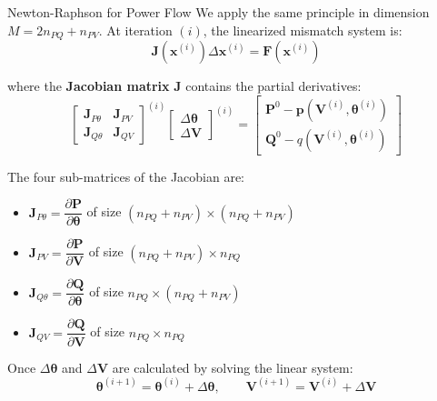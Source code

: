 \begin{frame}[allowframebreaks]{Newton-Raphson for Power Flow}
    We apply the same principle in dimension $M = 2 n_{PQ} + n_{PV}$.
    At iteration $(i)$, the linearized mismatch system is:
    \begin{equation}
        \mathbf{J}(\mathbf{x}^{(i)}) \Delta \mathbf{x}^{(i)} = \mathbf{F}(\mathbf{x}^{(i)})
    \end{equation}
    
    where the \textbf{Jacobian matrix} $\mathbf{J}$ contains the partial derivatives:
    \begin{equation}
        \begin{bmatrix}
            \mathbf{J}_{P\theta} & \mathbf{J}_{PV} \\[0.6em]
            \mathbf{J}_{Q\theta} & \mathbf{J}_{QV}
        \end{bmatrix}^{(i)}
        \begin{bmatrix}
            \Delta \boldsymbol{\theta} \\[0.6em]
            \Delta \mathbf{V}
        \end{bmatrix}^{(i)}
        =
        \begin{bmatrix}
            \mathbf{P}^0 - \mathbf{p}(\mathbf{V}^{(i)}, \boldsymbol{\theta}^{(i)}) \\[0.6em]
            \mathbf{Q}^0 - q(\mathbf{V}^{(i)}, \boldsymbol{\theta}^{(i)})
        \end{bmatrix}
    \end{equation}

    \newpage
    The four sub-matrices of the Jacobian are:
    \begin{itemize}
        \item $\mathbf{J}_{P\theta} = \dfrac{\partial \mathbf{P}}{\partial \boldsymbol{\theta}}$ of size $(n_{PQ} + n_{PV}) \times (n_{PQ} + n_{PV})$
        \item $\mathbf{J}_{PV} = \dfrac{\partial \mathbf{P}}{\partial \mathbf{V}}$ of size $(n_{PQ} + n_{PV}) \times n_{PQ}$
        \item $\mathbf{J}_{Q\theta} = \dfrac{\partial \mathbf{Q}}{\partial \boldsymbol{\theta}}$ of size $n_{PQ} \times (n_{PQ} + n_{PV})$
        \item $\mathbf{J}_{QV} = \dfrac{\partial \mathbf{Q}}{\partial \mathbf{V}}$ of size $n_{PQ} \times n_{PQ}$
    \end{itemize}

    \vspace{0.2cm}
    Once $\Delta \boldsymbol{\theta}$ and $\Delta \mathbf{V}$ are calculated by solving the linear system:
    $$\boldsymbol{\theta}^{(i+1)} = \boldsymbol{\theta}^{(i)} + \Delta \boldsymbol{\theta}, \qquad \mathbf{V}^{(i+1)} = \mathbf{V}^{(i)} + \Delta \mathbf{V}$$
\end{frame}

